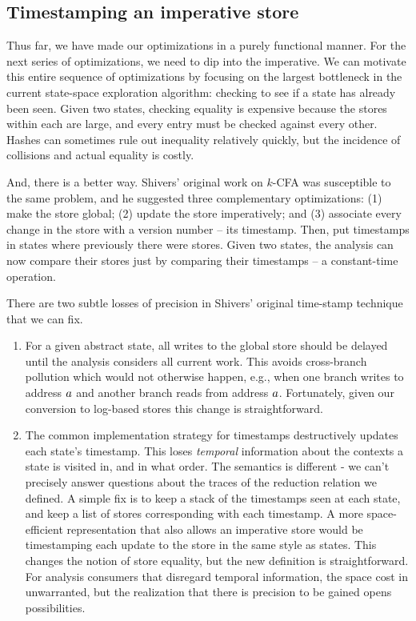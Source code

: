 \documentclass[preprint,onecolumn,9pt]{sigplanconf} %
\begin{document}

\subsection{Timestamping an imperative store}

Thus far, we have made our optimizations in a purely functional
manner. For the next series of optimizations, we need to dip into the
imperative. We can motivate this entire sequence of optimizations by
focusing on the largest bottleneck in the current state-space
exploration algorithm: checking to see if a state has already been
seen. Given two states, checking equality is expensive because the
stores within each are large, and every entry must be checked against
every other. Hashes can sometimes rule out inequality relatively
quickly, but the incidence of collisions and actual equality is
costly.

And, there is a better way. Shivers' original work on $k$-CFA was
susceptible to the same problem, and he suggested three complementary
optimizations: (1) make the store global; (2) update the store
imperatively; and (3) associate every change in the store with a
version number -- its timestamp. Then, put timestamps in states
where previously there were stores. Given two states, the analysis can
now compare their stores just by comparing their timestamps -- a
constant-time operation.

There are two subtle losses of precision in Shivers' original
time-stamp technique that we can fix.

\begin{enumerate}
 \item{For a given abstract
state, all writes to the global store should be delayed until the
analysis considers all current work. This avoids
cross-branch pollution which would not otherwise happen, e.g., when
one branch writes to address $a$ and another branch reads from
address $a$. Fortunately, given our conversion to log-based
stores this change is straightforward.}
\item{The common implementation strategy for timestamps destructively
    updates each state's timestamp. This loses \emph{temporal}
    information about the contexts a state is visited in, and in what
    order. The semantics is different - we can't precisely answer
    questions about the traces of the reduction relation we defined. A
    simple fix is to keep a stack of the timestamps seen at each
    state, and keep a list of stores corresponding with each
    timestamp. A more space-efficient representation that also allows
    an imperative store would be timestamping each update to the store
    in the same style as states. This changes the notion of store
    equality, but the new definition is straightforward. For analysis
    consumers that disregard temporal information, the space cost in
    unwarranted, but the realization that there is precision to be
    gained opens possibilities.}
\end{enumerate}
\end{document}
